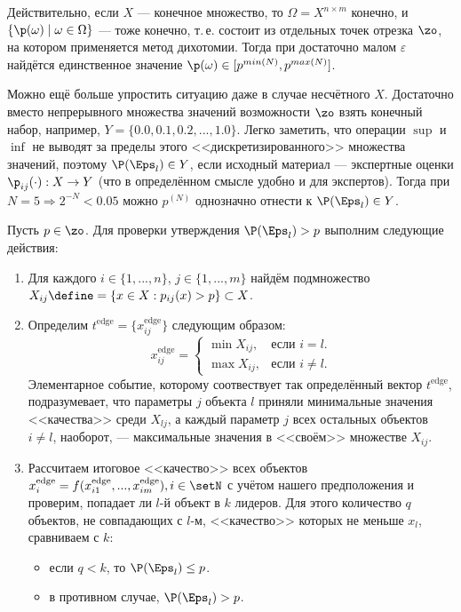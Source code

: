 Действительно, если $X$ --- конечное множество, то $\Omega=X^{n\times m}$ конечно, и $\{\p(\omega)\mid\omega\in\Omega\}$ --- тоже конечно, т.\,е. состоит из отдельных точек отрезка $\zo$, на котором применяется метод дихотомии. Тогда при достаточно малом $\varepsilon$ найдётся единственное значение $\p(\omega)\in[p^{min(N)}, p^{max(N)}]$. 

Можно ещё больше упростить ситуацию даже в случае несчётного $X$. Достаточно вместо непрерывного множества значений возможности $\zo$ взять конечный набор, например, $Y = \{0.0, 0.1, 0.2, ..., 1.0\}$. Легко заметить, что операции $\sup$ и $\inf$ не выводят за пределы этого <<дискретизированного>> множества значений, поэтому $\P(\Eps_l) \in Y$, если исходный материал --- экспертные оценки $\p_{ij}(\cdot): X \rightarrow Y$ (что в определённом смысле удобно и для экспертов). Тогда при $N = 5 \Rightarrow 2^{-N} < 0.05$ можно $p^{(N)}$ однозначно отнести к $\P(\Eps_l) \in Y$.

Пусть $p \in \zo$. Для проверки утверждения $\P(\Eps_l) > p$ выполним следующие действия: 
\begin{enumerate}
  \item 
  Для каждого $i \in \{1, ..., n\}$, $j \in \{1, ..., m\}$ найдём подмножество $X_{ij} \define= \{x \in X: p_{ij}(x) > p\} \subset X$. 
  \item 
  Определим $t^\text{edge} = \{x_{ij}^\text{edge}\}$ следующим образом:
  \begin{equation*}
    x_{ij}^\text{edge} =
    \begin{cases}
      \min X_{ij}, &\text{если $i = l$.}\\
      \max X_{ij}, &\text{если $i \neq l$.} 
    \end{cases}
  \end{equation*}
  Элементарное событие, которому соотвествует так определённый вектор $t^\text{edge}$, подразумевает, что параметры $j$ объекта $l$ приняли минимальные значения <<качества>> среди $X_{lj}$, а каждый параметр $j$ всех остальных объектов $i \neq l$, наоборот, --- максимальные значения в <<своём>> множестве $X_{ij}$. 
  \item
  Рассчитаем итоговое <<качество>> всех объектов $x_i^\text{edge} = f(x_{i1}^\text{edge}, ..., x_{im}^\text{edge}), i \in \setN$ с учётом нашего предположения и проверим, попадает ли $l$-й объект в $k$ лидеров. Для этого количество $q$ объектов, не совпадающих с $l$-м, <<качество>> которых не меньше $x_l$, сравниваем с $k$:
 	\begin{itemize}
		\item если $q < k$, то $\P(\Eps_l) \leq p$.
		\item в противном случае, $\P(\Eps_l) > p$.
	\end{itemize} 
\end{enumerate}  

